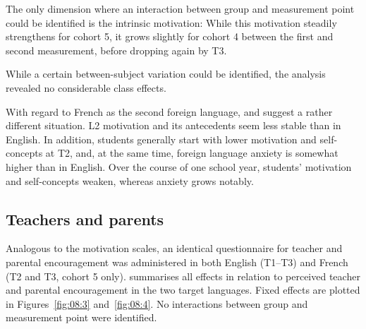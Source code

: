 \documentclass[output=paper]{langsci/langscibook}
\begin{document}
\begin{sloppypar}
The only dimension where an interaction between group and measurement point could be identified is the intrinsic motivation: While this motivation steadily strengthens for cohort 5, it grows slightly for cohort 4 between the first and second measurement, before dropping again by T3. 
\end{sloppypar}

While a certain between-subject variation could be identified, the analysis revealed no considerable class effects.

With regard to French as the second foreign language,   and   suggest a rather different situation. L2 motivation and its antecedents seem less stable than in English. In addition, students generally start with lower motivation and self-concepts at T2, and, at the same time, foreign language anxiety is somewhat higher than in English. Over the course of one school year, students’ motivation and self-concepts weaken, whereas anxiety grows notably.

\subsection{Teachers and parents}

Analogous to the motivation scales, an identical questionnaire for teacher and parental encouragement was administered in both English (T1--T3) and French (T2 and T3, cohort 5 only).   summarises all effects in relation to perceived teacher and parental encouragement in the two target languages. Fixed effects are plotted in Figures~\ref{fig:08:3}  and~\ref{fig:08:4}. No interactions between group and measurement point were identified.


\begin{table}
\caption{Fixed and random effects for perceived teacher and parental encouragement\label{tab:08:4}. EN: English, FR: French, TE: Teacher encouragement, PE: Parental encouragement, Int: Intercept.}
\end{table}
\end{document}
